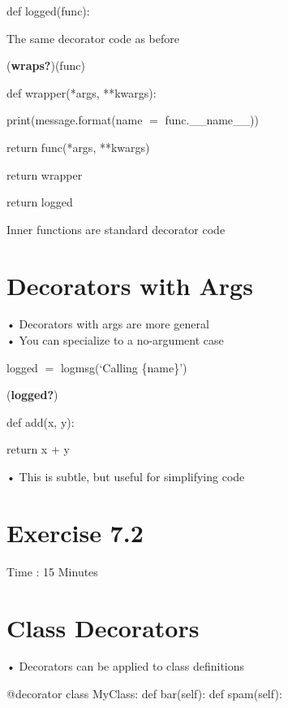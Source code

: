 \documentclass[
  letterpaper,
  DIV=11,
  numbers=noendperiod]{scrreprt}
\newenvironment{Shaded}{\begin{snugshade}}{\end{snugshade}}
\newcommand{\NormalTok}[1]{\textcolor[rgb]{0.00,0.23,0.31}{#1}}
\begin{document}
def logged(func):

The same decorator code as before

(\textbf{wraps?})(func)

def wrapper(*args, **kwargs):

print(message.format(name \(=\) func.\_\_name\_\_))

return func(*args, **kwargs)

return wrapper

return logged

Inner functions are standard decorator code


\chapter{Decorators with Args}\label{decorators-with-args-4}

• Decorators with args are more general\\
• You can specialize to a no-argument case

logged \(=\) logmsg(`Calling \{name\}')

(\textbf{logged?})

def add(x, y):

return x + y

• This is subtle, but useful for simplifying code


\chapter{Exercise 7.2}\label{exercise-7.2}

Time : 15 Minutes


\chapter{Class Decorators}\label{class-decorators}

• Decorators can be applied to class definitions

\begin{Shaded}
\begin{Highlighting}[]
\NormalTok{@decorator   }
\NormalTok{class MyClass: def bar(self): def spam(self): }
\end{Highlighting}
\end{Shaded}
\end{document}

